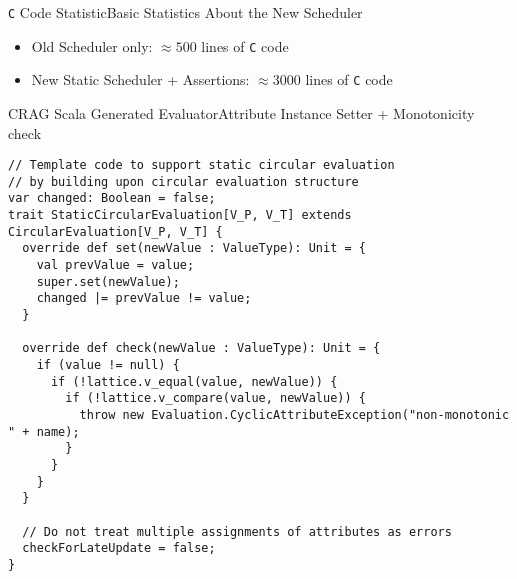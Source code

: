 

\begin{frame}{\texttt{C} Code Statistic}{Basic Statistics About the New Scheduler}
    \begin{itemize}
        \item Old Scheduler only: $\approx500$ lines of \texttt{C} code
        \item New Static Scheduler + \alert{Assertions}: $\approx 3000$ lines of \texttt{C} code
    \end{itemize}
\end{frame}



\begin{frame}[fragile=singleslide]{CRAG Scala Generated Evaluator}{Attribute Instance Setter + Monotonicity check}
\begin{Verbatim}[fontsize=\scriptsize]
// Template code to support static circular evaluation
// by building upon circular evaluation structure
var changed: Boolean = false;
trait StaticCircularEvaluation[V_P, V_T] extends CircularEvaluation[V_P, V_T] {
  override def set(newValue : ValueType): Unit = {
    val prevValue = value;
    super.set(newValue);
    changed |= prevValue != value;
  }

  override def check(newValue : ValueType): Unit = {
    if (value != null) {
      if (!lattice.v_equal(value, newValue)) {
        if (!lattice.v_compare(value, newValue)) {
          throw new Evaluation.CyclicAttributeException("non-monotonic " + name);
        }
      }
    }
  }
  
  // Do not treat multiple assignments of attributes as errors
  checkForLateUpdate = false;
}
\end{Verbatim}
\end{frame}


